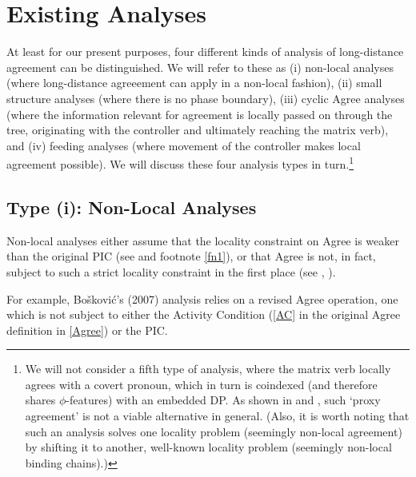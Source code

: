 \documentclass[output=paper
,modfonts
,nonflat]{langsci/langscibook}
\begin{document}
\section{Existing Analyses}

At least for our present purposes, four different kinds of analysis
of long-distance agreement can be distinguished. We will refer to
these as (i) non-local analyses (where long-distance agreeement can
apply in a non-local fashion),  (ii) small structure analyses (where
there is no phase boundary), (iii) cyclic Agree analyses (where the
information relevant for agreement is locally passed on through the
tree, originating with the controller and ultimately reaching the
matrix verb), and (iv) feeding analyses (where movement
of the controller makes 
local agreement possible). We will discuss these four analysis types in
turn.\footnote{We will not consider a fifth type of analysis, where
  the matrix verb locally agrees with a covert pronoun, which in turn
  is coindexed (and therefore shares $\phi$-features) with an
  embedded DP. As shown in \cite{Polinsky&Potsdam:01} and
  \cite{Bhatt&Keine:16:lon}, such `proxy agreement' is not a viable
  alternative in general. (Also, it is worth noting that such an
  analysis solves one locality problem (seemingly non-local agreement)
by shifting it to another, well-known locality problem (seemingly
non-local binding chains).)}

\subsection{Type (i): Non-Local Analyses}

Non-local analyses either assume that the locality constraint on Agree
is weaker than the original PIC (see \cite{Chomsky:01} and footnote
\ref{fn1}), or that Agree is not, in fact, subject to such a strict
locality constraint in the first place (see \cite{Sells:06} \cite{Boskovic:07},
\cite{Keine:16}).

For example, Bo\v{s}kovi{\'c}'s (2007) analysis relies on a revised
Agree operation, one which is not subject to either the  Activity
  Condition (\ref{AC} in the original Agree definition in
\ref{Agree}) or the PIC. 
\end{document}
